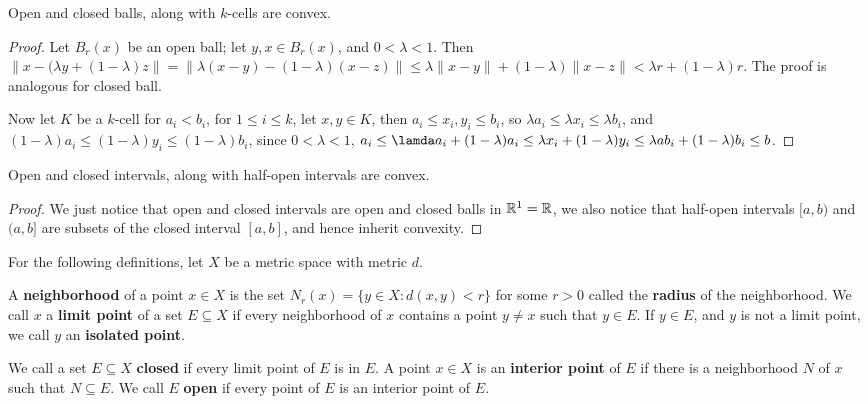 \begin{lemma}\label{theorem_2.2.1}
  Open and closed balls, along with $k$-cells are convex.
\end{lemma}
\begin{proof}
  Let $B_r(x)$ be an open ball; let $y,x \in B_r(x)$, and  $0<\lambda<1$. Then
  $\|x-(\lambda y+(1-\lambda)z\|=\|\lambda(x-y)-(1-\lambda)(x-z)\| \leq
  \lambda\|x-y\|+(1-\lambda)\|x-z\|<\lambda r+(1-\lambda)r$.
  The proof is analogous for  closed ball.

  Now let  $K$ be a  $k$-cell for  $a_i<b_i$, for  $1 \leq i \leq k$, let  $x,y \in
  K$, then $a_i \leq x_i,y_i \leq b_i$, so  $\lambda a_i \leq \lambda x_i \leq
  \lambda b_i$, and $(1-\lambda)a_i \leq (1-\lambda)y_i \leq (1-\lambda)b_i$, since
  $0<\lambda<1$, $a_i \leq \lamda a_i+(1-\lambda)a_i \leq \lambda x_i+(1-\lambda)y_i
  \leq \lambda a b_i+(1-\lambda)b_i \leq b$.
\end{proof}

\begin{corollary}
  Open and closed intervals, along with half-open intervals are convex.
\end{corollary}
\begin{proof}
  We just notice that open and closed intervals are open and closed balls in
  $\mathbb{R}^1=\mathbb{R}$, we also notice that half-open intervals $[a,b)$ and  $(a,b]$ are
  subsets of the closed interval $[a,b]$, and hence inherit convexity.
\end{proof}

For the following definitions, let $X$ be a metric space with metric $d$.

\begin{definition}
  A  \textbf{neighborhood} of a point $x \in X$ is the set
  $N_r(x)=\{y \in X: d(x,y)<r\}$ for some $r>0$ called the \textbf{radius} of the
  neighborhood. We call  $x$ a \textbf{limit point} of a set  $E \subseteq X$ if
  every neighborhood of  $x$ contains a point  $y \neq x$ such that  $y \in E$.
  If $y \in E$, and $y$ is not a limit point, we call  $y$ an
  \textbf{isolated point}.
\end{definition}

\begin{definition}
  We call a set $E \subseteq X$ \textbf{closed} if every limit point of $E$ is
  in $E$. A point $x \in X$ is an \textbf{interior point} of $E$ if there is a
  neighborhood $N$ of  $x$ such that $N \subseteq E$. We call  $E$ \textbf{open}
  if every point of  $E$ is an interior point of $E$.
\end{definition}

